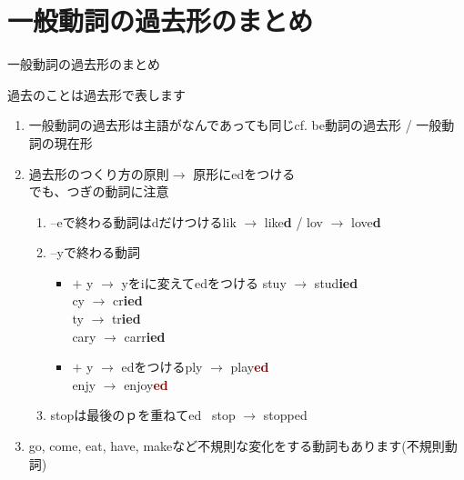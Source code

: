 \documentclass[aspectratio=169,xcolor={dvipsnames,table}]{beamer}
\begin{document}
\section{一般動詞の過去形のまとめ}
\begin{frame}[plain]{一般動詞の過去形のまとめ}
 \begin{alertblock}{過去のことは過去形で表します}\small
\pause
\begin{enumerate}
 \item 一般動詞の過去形は主語がなんであっても同じ\hfill{}{\scriptsize cf. be動詞の過去形 / 一般動詞の現在形}\pause
 \item 過去形のつくり方の原則$\longrightarrow$ 原形にedをつける\\\pause
でも、つぎの動詞に注意\pause
       \begin{enumerate}
	\item --eで終わる動詞はdだけつける\hfill{}lik $\rightarrow$ like\textcolor{OliveGreen}{\bfseries d} / lov $\rightarrow$ love\textcolor{OliveGreen}{\bfseries d}\pause
	\item --yで終わる動詞\pause
\begin{itemize}
	         \item {} $+$ y $\longrightarrow$ yをiに変えてedをつける%
\hfill{}stuy $\rightarrow$ stud\textcolor{NavyBlue}{\bfseries ied}\\
\hfill{}cy $\rightarrow$ cr\textcolor{NavyBlue}{\bfseries ied}\\
\hfill{}ty $\rightarrow$ tr\textcolor{NavyBlue}{\bfseries ied}\\
\hfill{}cary $\rightarrow$ carr\textcolor{NavyBlue}{\bfseries ied}\pause
  \item {} $+$ y $\longrightarrow$ edをつける\hfill{}ply $\rightarrow$ play\textcolor{Maroon}{\bfseries ed}\\
\hfill{}enjy $\rightarrow$ enjoy\textcolor{Maroon}{\bfseries ed}\pause
	      \end{itemize}
	\item stopは最後のｐを重ねてed\,\,\,\,\,stop $\longrightarrow$ stopped
       \end{enumerate}\pause
 \item go, come, eat, have, makeなど不規則な変化をする動詞もあります(不規則動詞)
\end{enumerate}


\end{alertblock}

\end{frame}
\end{document}
